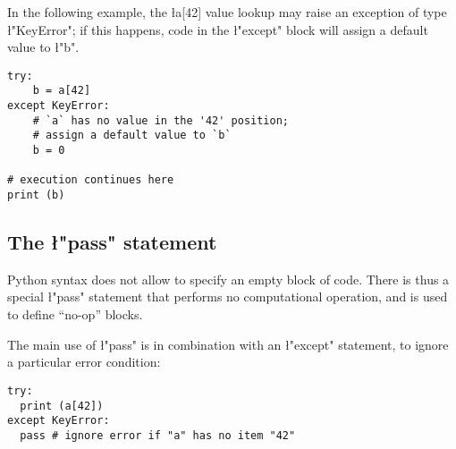 In the following example, the \l{a[42]} value lookup may
raise an exception of type \l"KeyError"; if this happens,
code in the \l"except" block will assign a default value to
\l"b".
\begin{lstlisting}
try:
    b = a[42]
except KeyError:
    # `a` has no value in the '42' position; 
    # assign a default value to `b`
    b = 0

# execution continues here
print (b)
\end{lstlisting}
                          

\subsection{The {\l"pass"} statement}
\label{sec:pass}

Python syntax does not allow to specify an empty block of code. There
is thus a special \l"pass" statement that performs no
computational operation, and is used to define ``no-op'' blocks.

The main use of \l"pass" is in combination with an
\l"except" statement, to ignore a particular error condition:
\begin{lstlisting}
try:
  print (a[42])
except KeyError:
  pass # ignore error if "a" has no item "42"
\end{lstlisting}



